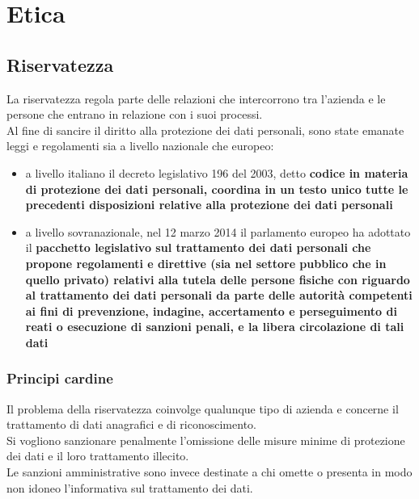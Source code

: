 \chapter{Etica}

\section{Riservatezza}
La riservatezza regola parte delle relazioni che intercorrono tra l'azienda e le persone che entrano in relazione con i suoi processi.\\
Al fine di sancire il diritto alla protezione dei dati personali, sono state emanate leggi e regolamenti sia a livello nazionale che europeo:
\begin{itemize}
	\item a livello italiano il decreto legislativo 196 del 2003, detto \bf codice in materia di protezione dei dati personali\rm, coordina in un testo unico tutte le precedenti disposizioni relative alla protezione dei dati personali
	\item a livello sovranazionale, nel 12 marzo 2014 il parlamento europeo ha adottato il \bf pacchetto legislativo sul trattamento dei dati personali \rm che propone regolamenti e direttive (sia nel settore pubblico che in quello privato) relativi alla tutela delle persone fisiche con riguardo al trattamento dei dati personali da parte delle autorit\`a competenti ai fini di prevenzione, indagine, accertamento e perseguimento di reati o esecuzione di sanzioni penali, e la libera circolazione di tali dati
\end{itemize}

\subsection{Principi cardine}
Il problema della riservatezza coinvolge qualunque tipo di azienda e concerne il trattamento di dati anagrafici e di riconoscimento.\\
Si vogliono sanzionare penalmente l'omissione delle misure minime di protezione dei dati e il loro trattamento illecito.\\
Le sanzioni amministrative sono invece destinate a chi omette o presenta in modo non idoneo l'informativa sul trattamento dei dati.\\

